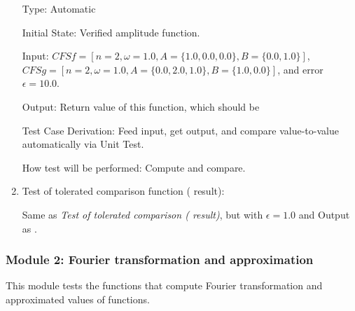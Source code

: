 \documentclass[12pt, titlepage]{article}
\begin{document}
\begin{enumerate}
	Type: Automatic
	
	Initial State: Verified amplitude function.
	
	Input: $\mathit{CFSf}=[n=2, \omega=1.0, A=\{1.0, 0.0, 0.0\}, B=\{0.0, 1.0\}]$, 
	$\mathit{CFSg}=[n=2, \omega=1.0, A=\{0.0, 2.0, 1.0\}, B=\{1.0, 0.0\}]$, and error $\epsilon=10.0$.
	
	Output: Return value of this function, which should be  
	
	Test Case Derivation: Feed input, get output, and compare value-to-value automatically via Unit Test.
	
	How test will be performed: Compute and compare.
	
	\item{Test of tolerated comparison function  ( result):\\}
	
          Same as \textit{Test of tolerated comparison ( result)}, but
          with $\epsilon=1.0$ and Output as .
\end{enumerate}

\subsubsection{Module 2: Fourier transformation and approximation}
This module tests the functions that compute Fourier transformation and
approximated values of functions.
\end{document}
